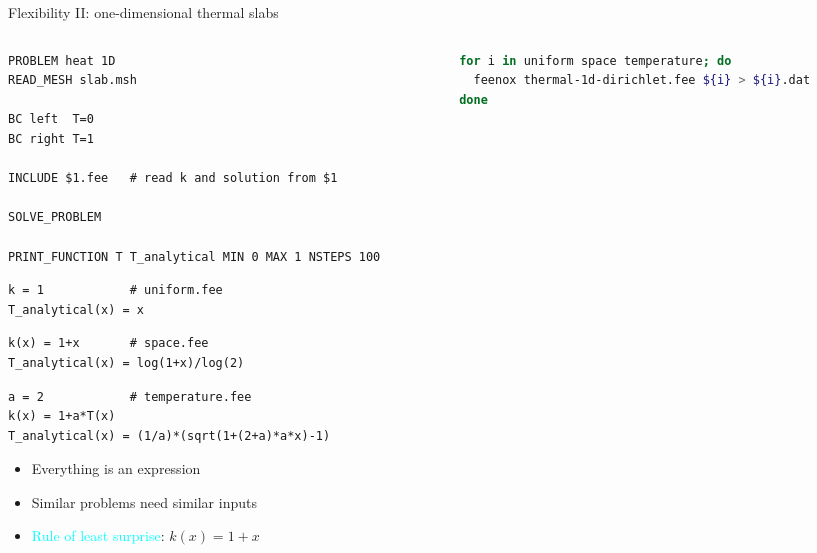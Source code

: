 \documentclass[
  ignorenonframetext,
  aspectratio=169,
]{beamer}
\providecommand{\tightlist}{%
  \setlength{\itemsep}{0pt}\setlength{\parskip}{0pt}}
\begin{document}
\begin{frame}[fragile]{Flexibility II: one-dimensional thermal slabs}
\protect\hypertarget{flexibility-ii-one-dimensional-thermal-slabs}{}
\begin{columns}[T]
\begin{column}{0.45\textwidth}
\begin{lstlisting}[style=feenox]
PROBLEM heat 1D
READ_MESH slab.msh

BC left  T=0
BC right T=1

INCLUDE $1.fee   # read k and solution from $1

SOLVE_PROBLEM

PRINT_FUNCTION T T_analytical MIN 0 MAX 1 NSTEPS 100
\end{lstlisting}

\begin{lstlisting}[style=feenox]
k = 1            # uniform.fee
T_analytical(x) = x
\end{lstlisting}

\begin{lstlisting}[style=feenox]
k(x) = 1+x       # space.fee
T_analytical(x) = log(1+x)/log(2)
\end{lstlisting}

\begin{lstlisting}[style=feenox]
a = 2            # temperature.fee
k(x) = 1+a*T(x)
T_analytical(x) = (1/a)*(sqrt(1+(2+a)*a*x)-1)
\end{lstlisting}

\pause

\begin{itemize}
\tightlist
\item
  Everything is an expression
\item
  Similar problems need similar inputs
\item
  {\textcolor{cyan}{Rule of {least surprise}}}: \(k(x)=1+x\)
\end{itemize}
\end{column}

\begin{column}{0.55\textwidth}
\begin{lstlisting}[language=bash, style=bash]
for i in uniform space temperature; do
  feenox thermal-1d-dirichlet.fee ${i} > ${i}.dat
done
\end{lstlisting}


\end{column}
\end{columns}
\end{frame}
\end{document}
